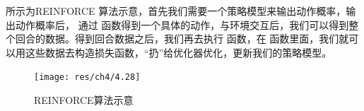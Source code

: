  所示为REINFORCE 算法示意，首先我们需要一个策略模型来输出动作概率，输出动作概率后，
通过  函数得到一个具体的动作，与环境交互后，我们可以得到整个回合的数据。得到回合数据之后，我们再去执行 函数，在  函数里面，我们就可以用这些数据去构造损失函数，“扔”给优化器优化，更新我们的策略模型。
\begin{figure}[hbt]
    \centering
    \texttt{[image: res/ch4/4.28]}
    \caption{REINFORCE算法示意}
    \label{fig:fig4.28}
\end{figure}









